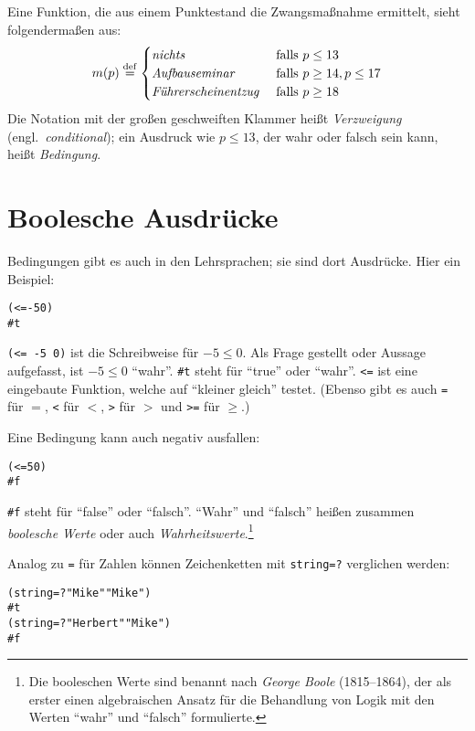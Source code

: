 Eine Funktion, die  aus einem Punktestand die Zwangsmaßnahme ermittelt,
sieht folgendermaßen aus:
%
\begin{displaymath}
  m(p) \stackrel{\rm def}{=}
  \begin{cases}
    \textit{nichts} & \textrm{falls $p \leq 13$}
    \\
    \textit{Aufbauseminar} & \textrm{falls $p \geq 14, p \leq 17$}
    \\
    \textit{Führerscheinentzug } & \textrm{falls $p \geq 18$}
  \end{cases}
\end{displaymath}
%
Die Notation mit der großen geschweiften Klammer heißt
\textit{Verzweigung} (engl.\
\textit{conditional}); ein Ausdruck wie $p\leq 13$,
der wahr oder falsch sein kann,
heißt \textit{Bedingung}.

\section{Boolesche Ausdrücke}

Bedingungen gibt es auch in den Lehrsprachen; sie sind dort Ausdrücke.
Hier ein Beispiel:
%
\begin{alltt}
(<= -5 0)
\evalsto{} #t
\end{alltt}
%
\texttt{(<= -5 0)} ist die Schreibweise für $-5 \leq 0$.  Als Frage
gestellt oder Aussage aufgefasst, ist $-5 \leq 0$ "`wahr"'.
\verb|#t| steht für "`true"' oder
"`wahr\index{wahr}"'.  \texttt{<=}\index{<=@\texttt{<=}} ist eine
eingebaute Funktion, welche auf "`kleiner gleich"' testet.  (Ebenso
gibt es auch \texttt{=}\index{=@\texttt{=}} für $=$, 
\texttt{<} für $<$,
\texttt{>} für $>$ und
\texttt{>=} für $\geq$.)

Eine Bedingung kann auch negativ ausfallen:
%
\begin{alltt}
(<= 5 0)
\evalsto{} #f
\end{alltt}
%
\verb|#f| steht für "`false"' oder "`falsch"'.
"`Wahr"' und "`falsch"' heißen zusammen \textit{boolesche
  Werte} oder auch
\textit{Wahrheitswerte}.\footnote{Die booleschen
  Werte sind benannt nach \textit{George Boole}
  (1815--1864), der als erster einen algebraischen Ansatz für die
  Behandlung von Logik mit den Werten "`wahr"' und "`falsch"'
  formulierte.}

Analog zu \texttt{=} für Zahlen können Zeichenketten mit
\texttt{string=?} verglichen werden:
\begin{alltt}
(string=? "Mike" "Mike")
\evalsto{} #t
(string=? "Herbert" "Mike")
\evalsto{} #f
\end{alltt}

